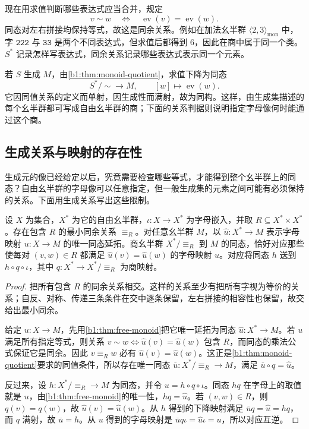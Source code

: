 \ProseParagraphBreak
现在用求值判断哪些表达式应当合并，规定
\[
	v\sim w\quad\Longleftrightarrow\quad \operatorname{ev}(v)=\operatorname{ev}(w).
\]
同态对左右拼接均保持等式，故这是同余关系。例如在加法幺半群 \(\langle2,3\rangle_{\mathrm{mon}}\) 中，字 \(\mathtt{222}\) 与 \(\mathtt{33}\) 是两个不同表达式，但求值后都得到 \(6\)，因此在商中属于同一个类。\(S^*\) 记录怎样写表达式，同余关系记录哪些表达式表示同一个元素。

\ProseParagraphBreak
若 \(S\) 生成 \(M\)，由\cref{b1:thm:monoid-quotient}，求值下降为同态
\[
	S^*/{\sim}\longrightarrow M,\qquad [w]\longmapsto\operatorname{ev}(w).
\]
它因同值关系的定义而单射，因生成性而满射，故为同构。这样，由生成集描述的每个幺半群都可写成自由幺半群的商；下面的关系判据则说明指定字母像何时能通过这个商。

\subsection{生成关系与映射的存在性}
\label{b1:subsec:0104:02}

生成元的像已经给定以后，究竟需要检查哪些等式，才能得到整个幺半群上的同态？自由幺半群的字母像可以任意指定，但一般生成集的元素之间可能有必须保持的关系。下面用生成关系写出这些限制。

\begin{proposition}[生成元与关系]\label{b1:prop:monoid-generators-relations}
	设 \(X\) 为集合，\(X^*\) 为它的自由幺半群，\(\iota:X\rightarrow X^*\) 为字母嵌入，并取 \(R\subseteq X^*\times X^*\)。存在包含 \(R\) 的最小同余关系 \(\equiv_R\)。对任意幺半群 \(M\)，以 \(\widehat u:X^*\rightarrow M\) 表示字母映射 \(u:X\rightarrow M\) 的唯一同态延拓。商幺半群 \(X^*/{\equiv_R}\) 到 \(M\) 的同态，恰好对应那些使每对 \((v,w)\in R\) 都满足 \(\widehat u(v)=\widehat u(w)\) 的字母映射 \(u\)。对应将同态 \(h\) 送到 \(h\circ q\circ\iota\)，其中 \(q:X^*\rightarrow X^*/{\equiv_R}\) 为商映射。
\end{proposition}

\begin{proof}
	把所有包含 \(R\) 的同余关系相交。这样的关系至少有把所有字视为等价的关系；自反、对称、传递三条条件在交中逐条保留，左右拼接的相容性也保留，故交给出最小同余。

	给定 \(u:X\rightarrow M\)，先用\cref{b1:thm:free-monoid}把它唯一延拓为同态 \(\widehat u:X^*\rightarrow M\)。若 \(u\) 满足所有指定等式，则关系 \(v\sim w\Longleftrightarrow\widehat u(v)=\widehat u(w)\) 包含 \(R\)，而同态的乘法公式保证它是同余。因此 \(v\equiv_R w\) 必有 \(\widehat u(v)=\widehat u(w)\)。这正是\cref{b1:thm:monoid-quotient}要求的同值条件，所以存在唯一同态 \(\overline u:X^*/{\equiv_R}\rightarrow M\)，满足 \(\overline u\circ q=\widehat u\)。

	反过来，设 \(h:X^*/{\equiv_R}\rightarrow M\) 为同态，并令 \(u=h\circ q\circ\iota\)。同态 \(hq\) 在字母上的取值就是 \(u\)，由\cref{b1:thm:free-monoid}的唯一性，\(hq=\widehat u\)。若 \((v,w)\in R\)，则 \(q(v)=q(w)\)，故 \(\widehat u(v)=\widehat u(w)\)。从 \(h\) 得到的下降映射满足 \(\overline u q=\widehat u=hq\)，而 \(q\) 满射，故 \(\overline u=h\)。从 \(u\) 得到的字母映射是 \(\overline u q\iota=\widehat u\iota=u\)，所以对应互逆。
\end{proof}

